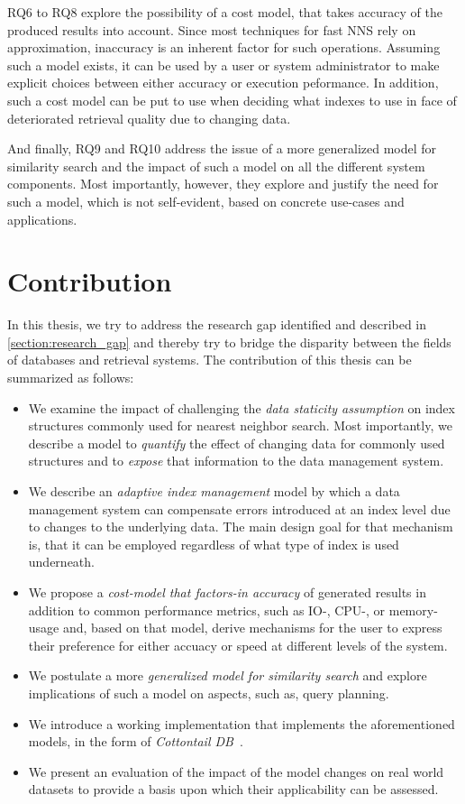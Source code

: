 RQ6 to RQ8 explore the possibility of a cost model, that takes accuracy of the produced results into account. Since most techniques for fast NNS rely on approximation, inaccuracy is an inherent factor for such operations. Assuming such a model exists, it can be used by a user or system administrator to make explicit choices between either accuracy or execution peformance. In addition, such a cost model can be put to use when deciding what indexes to use in face of deteriorated retrieval quality due to changing data.

And finally, RQ9 and RQ10 address the issue of a more generalized model for similarity search and the impact of such a model on all the different system components. Most importantly, however, they explore and justify the need for such a model, which is not self-evident, based on concrete use-cases and applications.

\section{Contribution}

In this thesis, we try to address the research gap identified and described in \cref{section:research_gap} and thereby try to bridge the disparity between the fields of databases and retrieval systems. The contribution of this thesis can be summarized as follows:

\begin{itemize}
    \item We examine the impact of challenging the \emph{data staticity assumption} on index structures commonly used for nearest neighbor search. Most importantly, we describe a model to \emph{quantify} the effect of changing data for commonly used structures and to \emph{expose} that information to the data management system.
    \item We describe an \emph{adaptive index management} model by which a data management system can compensate errors introduced at an index level due to changes to the underlying data. The main design goal for that mechanism is, that it can be employed regardless of what type of index is used underneath.
    \item We propose a \emph{cost-model that factors-in accuracy} of generated results in addition to common performance metrics, such as IO-, CPU-, or memory-usage and, based on that model, derive mechanisms for the user to express their preference for either accuacy or speed at different levels of the system.
    \item We postulate a more \emph{generalized model for similarity search} and explore implications of such a model on aspects, such as, query planning.
    \item We introduce a working implementation that implements the aforementioned models, in the form of \emph{Cottontail DB}~\cite{Gasser:2020cottontail}.
    \item We present an evaluation of the impact of the model changes on real world datasets to provide a basis upon which their applicability can be assessed.
\end{itemize}

